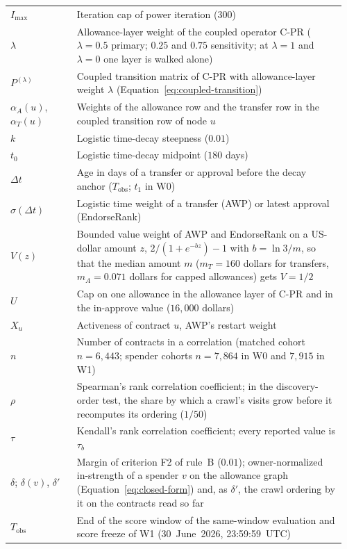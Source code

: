 \begin{longtable}{@{}>{\raggedright\arraybackslash}p{0.19\linewidth}p{0.77\linewidth}@{}}
$I_{\max}$ & Iteration cap of power iteration ($300$) \\
$\lambda$ & Allowance-layer weight of the coupled operator \mbox{C-PR} ($\lambda=0.5$ primary; $0.25$ and $0.75$ sensitivity; at $\lambda=1$ and $\lambda=0$ one layer is walked alone) \\
$P^{(\lambda)}$ & Coupled transition matrix of \mbox{C-PR} with allowance-layer weight $\lambda$ (Equation~\eqref{eq:coupled-transition}) \\
$\alpha_A(u)$, $\alpha_T(u)$ & Weights of the allowance row and the transfer row in the coupled transition row of node $u$ \\
$k$ & Logistic time-decay steepness ($0.01$) \\
$t_0$ & Logistic time-decay midpoint ($180$ days) \\
$\Delta t$ & Age in days of a transfer or approval before the decay anchor ($T_{\mathrm{obs}}$; $t_1$ in W0) \\
$\sigma(\Delta t)$ & Logistic time weight of a transfer (AWP) or latest approval (EndorseRank) \\
$V(z)$ & Bounded value weight of AWP and EndorseRank on a US-dollar amount $z$, $2/(1+e^{-bz})-1$ with $b=\ln 3/m$, so that the median amount $m$ ($m_T=160$ dollars for transfers, $m_A=0.071$ dollars for capped allowances) gets $V=1/2$ \\
$U$ & Cap on one allowance in the allowance layer of \mbox{C-PR} and in the in-approve value ($16{,}000$ dollars) \\
$X_u$ & Activeness of contract $u$, AWP's restart weight \\
$n$ & Number of contracts in a correlation (matched cohort $n=6{,}443$; spender cohorts $n=7{,}864$ in W0 and $7{,}915$ in W1) \\
$\rho$ & Spearman's rank correlation coefficient; in the discovery-order test, the share by which a crawl's visits grow before it recomputes its ordering ($1/50$) \\
$\tau$ & Kendall's rank correlation coefficient; every reported value is $\tau_b$ \\
$\delta$; $\delta(v)$, $\delta'$ & Margin of criterion F2 of rule~B ($0.01$); owner-normalized in-strength of a spender $v$ on the allowance graph (Equation~\eqref{eq:closed-form}) and, as $\delta'$, the crawl ordering by it on the contracts read so far \\
$T_{\mathrm{obs}}$ & End of the score window of the same-window evaluation and score freeze of W1 (30~June~2026, 23:59:59~UTC) \\

\end{longtable}
